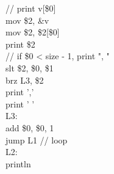 \documentclass[12pt,a4paper,extrafontsizes,article]{memoir}
\begin{document}
{{\color{green!50!black}// print v[\$0]}\\
{\color{violet}mov} \$2, \&v\\
{\color{violet}mov} \$2, \$2[\$0]\\
{\color{violet}print} \$2\\
{\color{green!50!black}// if \$0 < size - 1, print ", "}\\
{\color{violet}slt} \$2, \$0, \$1\\
{\color{violet}brz} L3, \$2\\
{\color{violet}print} {\color{orange}','}\\
{\color{violet}print} {\color{orange}' '}\\
{\color{red}L3:}\\
{\color{violet}add} \$0, \$0, {\color{orange}1}\\
{\color{violet}jump} L1 {\color{green!50!black}// loop}\\
{\color{red}L2:}\\
{\color{violet}println}\\
}


\backmatter


\end{document}
